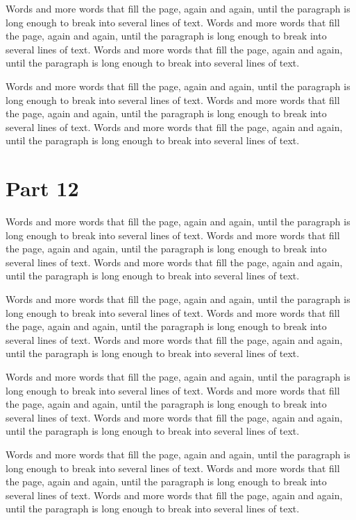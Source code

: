 \documentclass{article}
\begin{document}
Words and more words that fill the page, again and again, until the paragraph is long enough to break into several lines of text. Words and more words that fill the page, again and again, until the paragraph is long enough to break into several lines of text. Words and more words that fill the page, again and again, until the paragraph is long enough to break into several lines of text. 

Words and more words that fill the page, again and again, until the paragraph is long enough to break into several lines of text. Words and more words that fill the page, again and again, until the paragraph is long enough to break into several lines of text. Words and more words that fill the page, again and again, until the paragraph is long enough to break into several lines of text. 

\section{Part 12}
Words and more words that fill the page, again and again, until the paragraph is long enough to break into several lines of text. Words and more words that fill the page, again and again, until the paragraph is long enough to break into several lines of text. Words and more words that fill the page, again and again, until the paragraph is long enough to break into several lines of text. 

Words and more words that fill the page, again and again, until the paragraph is long enough to break into several lines of text. Words and more words that fill the page, again and again, until the paragraph is long enough to break into several lines of text. Words and more words that fill the page, again and again, until the paragraph is long enough to break into several lines of text. 

Words and more words that fill the page, again and again, until the paragraph is long enough to break into several lines of text. Words and more words that fill the page, again and again, until the paragraph is long enough to break into several lines of text. Words and more words that fill the page, again and again, until the paragraph is long enough to break into several lines of text. 

Words and more words that fill the page, again and again, until the paragraph is long enough to break into several lines of text. Words and more words that fill the page, again and again, until the paragraph is long enough to break into several lines of text. Words and more words that fill the page, again and again, until the paragraph is long enough to break into several lines of text. 
\end{document}
